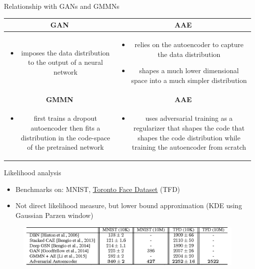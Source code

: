 \documentclass[10pt]{beamer}
\begin{document}
\begin{frame}{Relationship with GANs and GMMNs}
\centering
\begin{tabular}{c c}
  \textbf{GAN} & \textbf{AAE} \\ \hline
  \parbox{0.45\linewidth}{\begin{itemize} 
      \item imposes the data distribution to the output of a neural network 
    \end{itemize}} & 
  \parbox{0.45\linewidth}{\begin{itemize}
      \item relies on the autoencoder to capture the data distribution
      \item shapes a much lower dimensional space into a much simpler distribution
    \end{itemize}} \\
  \textbf{GMMN} & \textbf{AAE} \\ \hline
  \parbox{0.45\linewidth}{\begin{itemize}
      \item first trains a dropout autoencoder then fits a distribution in the code-space of the pretrained network
  \end{itemize}} &
  \parbox{0.45\linewidth}{\begin{itemize}
      \item uses adversarial training as a regularizer that shapes the code that shapes the code distribution while training the autoencoder from scratch
  \end{itemize}}
\end{tabular}
\end{frame}

\begin{frame}{Likelihood analysis}
\begin{itemize}
  \item Benchmarks on: MNIST, \href{../images/tfd.gif}{\underline{Toronto Face Dataset}} (TFD)
  \item Not direct likelihood measure, but lower bound approximation (KDE using Gaussian Parzen window)
\end{itemize}
\begin{figure}
  \centering
  \includegraphics[width=\linewidth]{../images/performance-table-01.png}
\end{figure}
\end{frame}
\end{document}
